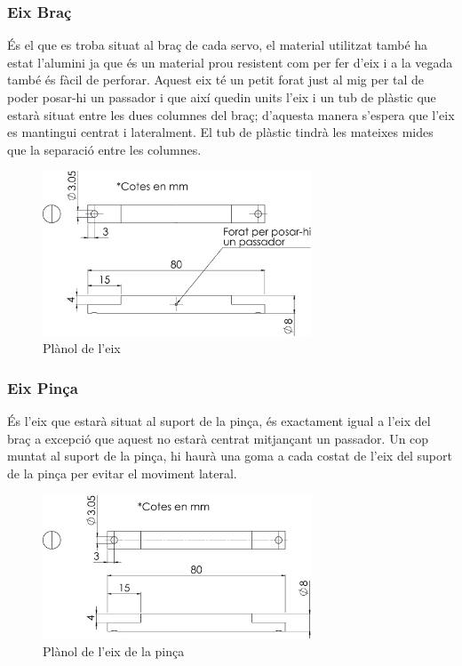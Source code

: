 \documentclass[a4paper, 12pt]{article}
\begin{document}
\subsubsection{Eix Braç}
És el que es troba situat al braç de cada servo, el material utilitzat també ha estat l'alumini ja que és un material prou resistent com per fer d'eix i a la vegada també és fàcil de perforar.
Aquest eix té un petit forat just al mig per tal de poder posar-hi un passador i que així quedin units l'eix i un tub de plàstic que estarà situat entre les dues columnes del braç; d'aquesta manera s'espera que l'eix es mantingui centrat i lateralment. El tub de plàstic tindrà les mateixes mides que la separació entre les columnes.
\begin{figure}[h!]
\centering
\includegraphics[width=8cm]{./sketch/eix}
\caption{Plànol de l'eix}
\end{figure}

\subsubsection{Eix Pinça}
És l'eix que estarà situat al suport de la pinça, és exactament igual a l'eix del braç a excepció que aquest no estarà centrat mitjançant un passador. Un cop muntat al suport de la pinça, hi haurà una goma a cada costat de l'eix del suport de la pinça per evitar el moviment lateral.
\begin{figure}[h!]
\centering
\includegraphics[width=8cm]{./sketch/eix2}
\caption{Plànol de l'eix de la pinça}
\end{figure}
\end{document}
